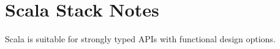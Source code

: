 \section{Scala Stack Notes}

Scala is suitable for strongly typed APIs with functional design options.
